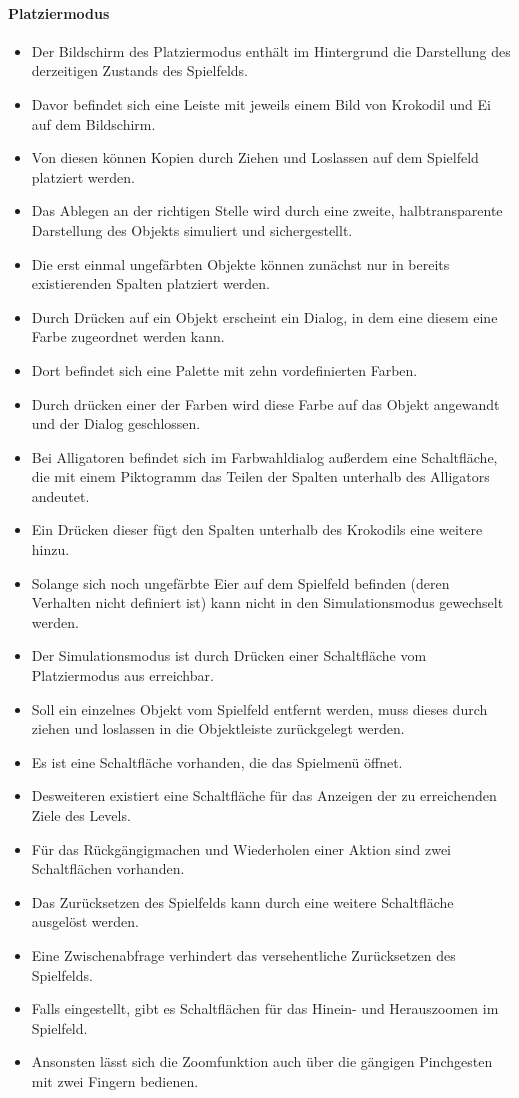 \paragraph{Platziermodus}\mbox{}\newline
\begin{itemize}
\item Der Bildschirm des Platziermodus enthält im Hintergrund die Darstellung
des derzeitigen Zustands des Spielfelds.
\item Davor befindet sich eine Leiste mit jeweils einem Bild von Krokodil und Ei auf dem Bildschirm.
\item Von diesen können Kopien durch Ziehen und Loslassen auf dem Spielfeld platziert werden. 
\item Das Ablegen an der richtigen Stelle wird durch eine zweite, 
halbtransparente Darstellung des Objekts simuliert und sichergestellt. 
\item Die erst einmal ungefärbten Objekte können zunächst nur in bereits 
existierenden Spalten platziert werden.
\item  Durch Drücken auf ein Objekt erscheint 
ein Dialog, in dem eine diesem eine Farbe zugeordnet werden kann.
\item Dort befindet sich eine Palette mit zehn vordefinierten Farben.
\item Durch drücken einer der Farben wird diese Farbe auf das Objekt angewandt und der Dialog geschlossen.
\item Bei Alligatoren befindet sich im Farbwahldialog außerdem eine Schaltfläche, die mit einem
Piktogramm das Teilen der Spalten unterhalb des Alligators andeutet.
\item Ein Drücken dieser fügt den Spalten unterhalb des Krokodils eine weitere hinzu.
\item Solange sich noch ungefärbte Eier auf dem Spielfeld befinden (deren Verhalten
nicht definiert ist) kann nicht in den Simulationsmodus gewechselt werden.
\item Der Simulationsmodus ist durch Drücken einer Schaltfläche vom Platziermodus
aus erreichbar.
\item Soll ein einzelnes Objekt vom Spielfeld entfernt werden, muss dieses durch ziehen und loslassen
in die Objektleiste zurückgelegt werden.
\item Es ist eine Schaltfläche vorhanden, die das Spielmenü öffnet.
\item Desweiteren existiert eine Schaltfläche für das Anzeigen der zu erreichenden Ziele des Levels.
\item Für das Rückgängigmachen und Wiederholen einer Aktion sind zwei Schaltflächen vorhanden.
\item Das Zurücksetzen des Spielfelds kann durch eine weitere Schaltfläche ausgelöst werden.
\item Eine Zwischenabfrage verhindert das versehentliche Zurücksetzen des Spielfelds.
\item Falls eingestellt, gibt es Schaltflächen für das Hinein- und Herauszoomen im Spielfeld.
\item Ansonsten lässt sich die Zoomfunktion auch über die gängigen Pinchgesten mit zwei Fingern bedienen.
\end{itemize}

